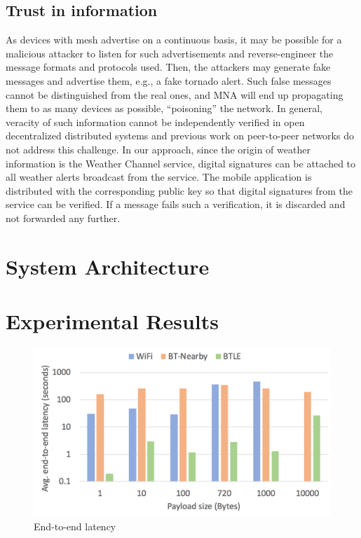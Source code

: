 \documentclass[conference]{IEEEtran}
\begin{document}
\subsection{Trust in information}
%
As devices with mesh advertise on a continuous basis, it may
be possible for a malicious attacker to listen for such advertisements
and reverse-engineer the message formats and protocols used. Then, the
attackers may generate fake messages and advertise them, e.g., a fake
tornado alert. Such false messages cannot be distinguished from the
real ones, and MNA will end up propagating them to as many devices as
possible, ``poisoning'' the network. In general, veracity of such
information cannot be independently verified in open decentralized
distributed systems and previous work on peer-to-peer networks do not
address this challenge. In our approach, since the origin of weather
information is the Weather Channel service, digital signatures can be
attached to all weather alerts broadcast from the service. The mobile
application is distributed with the corresponding public key so that
digital signatures from the service can be verified. If a message
fails such a verification, it is discarded and not forwarded any
further.

\section{System Architecture}
\label{sec:architecture}

\section{Experimental Results}
\label{sec:eval}

\begin{figure}[htbp]
\centerline{\includegraphics[width=\columnwidth]{figs/e2e_latency}}
\caption{End-to-end latency}
\label{fig:e2e}
\end{figure}
\end{document}

